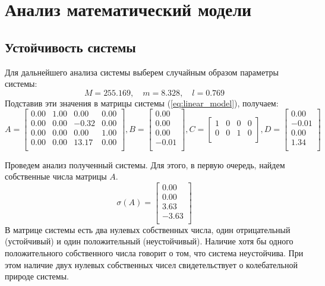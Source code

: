 \section{Анализ математический модели}
\subsection{Устойчивость системы} 
Для дальнейшего анализа системы выберем случайным образом параметры системы:
\begin{equation}
    M = 255.169,\quad m = 8.328,\quad l = 0.769
\end{equation}
Подставив эти значения в матрицы системы (\ref{eq:linear_model}), получаем: 
\begin{equation}
    A = \begin{bmatrix}
    0.00  & 1.00  & 0.00  & 0.00 \\ 
    0.00  & 0.00  & -0.32  & 0.00 \\ 
    0.00  & 0.00  & 0.00  & 1.00 \\ 
    0.00  & 0.00  & 13.17  & 0.00 \\ 
    \end{bmatrix},
    B = \begin{bmatrix}
    0.00 \\ 
    0.00 \\ 
    0.00 \\ 
    -0.01 \\ 
    \end{bmatrix}, 
    C = \begin{bmatrix}
    1  & 0  & 0  & 0 \\ 
    0  & 0  & 1  & 0 \\ 
    \end{bmatrix},
    D = \begin{bmatrix}
    0.00 \\ 
    -0.01 \\ 
    0.00 \\ 
    1.34 \\ 
    \end{bmatrix}
\end{equation}

Проведем анализ полученный системы. Для этого, в первую очередь, найдем собственные числа матрицы $A$. 
\begin{equation}
    \sigma(A) = \begin{bmatrix}
    0.00 \\ 
    0.00 \\ 
    3.63 \\ 
    -3.63 \\ 
    \end{bmatrix}
\end{equation}
В матрице системы есть два нулевых собственных числа, один отрицательный (устойчивый) и один положительный (неустойчивый). 
Наличие хотя бы одного положительного собственного числа говорит о том, что система неустойчива. При этом 
наличие двух нулевых собственных чисел свидетельствует о колебательной природе системы. 

